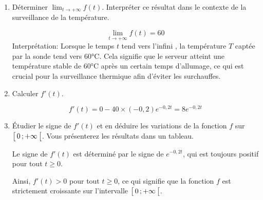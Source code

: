\documentclass[11pt, a4paper]{report}
\begin{document}
\begin{enumerate}
    \item Déterminer $\displaystyle\lim_{t \to +\infty} f(t)$. Interpréter ce résultat dans le contexte de la surveillance de la température.
    \begin{blocvisiblex}[height=3]
        {\quad}
        \[\lim_{t \to +\infty} f(t) = 60\]
        Interprétation: Lorsque le temps $t$ tend vers l'infini
, la température $T$ captée par la sonde tend vers 60°C. Cela signifie que le serveur atteint une température stable de 60°C après un certain temps d'allumage, ce qui est crucial pour la surveillance thermique afin d'éviter les surchauffes.

    \end{blocvisiblex}

    \medskip

    \item Calculer $f'(t)$.  
    \begin{blocvisiblex}[height=1.5]
        {\quad}
        \[f'(t) = 0-40 \times (-0,2) e^{-0,2t} = 8 e^{-0,2t}\]
    \end{blocvisiblex}

    \medskip

    \item Étudier le signe de $f'(t)$ et en déduire les variations de la fonction $f$ sur $\bigl[ \, 0 \, ; +\infty \,\bigl[$. Vous présenterez les résultats dans un tableau.
    \begin{blocvisiblex}[height=4]
        {\quad}

        \begin{minipage}{0.54\linewidth}
                    Le signe de $f'(t)$ est déterminé par le signe de $e^{-0,2t}$, qui est toujours positif pour tout $t \geq 0$. 
                    
                    
                    Ainsi, $f'(t) > 0$ pour tout $t \geq 0$, ce qui signifie que la fonction $f$ est strictement croissante sur l'intervalle $\bigl[ \, 0 \, ; +\infty \,\bigl[$.

        \end{minipage}\hfill
        \begin{minipage}{0.45\linewidth}
        \end{minipage}
    \end{blocvisiblex}
    

\end{enumerate}
\end{document}
